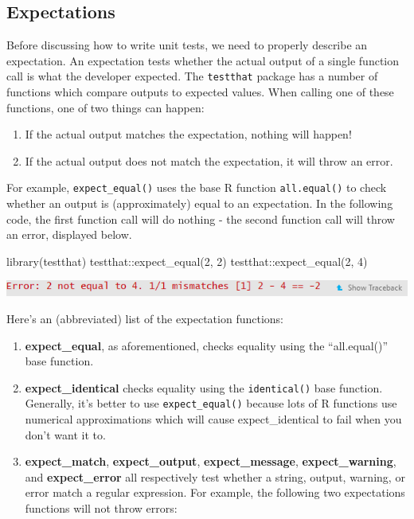 \documentclass[
]{book}
\newenvironment{Shaded}{\begin{snugshade}}{\end{snugshade}}
\newcommand{\DecValTok}[1]{\textcolor[rgb]{0.00,0.00,0.81}{#1}}
\newcommand{\FunctionTok}[1]{\textcolor[rgb]{0.00,0.00,0.00}{#1}}
\newcommand{\NormalTok}[1]{#1}
\newcommand{\SpecialCharTok}[1]{\textcolor[rgb]{0.00,0.00,0.00}{#1}}
\providecommand{\tightlist}{%
  \setlength{\itemsep}{0pt}\setlength{\parskip}{0pt}}
\begin{document}
\hypertarget{expectations}{%
\subsection{Expectations}\label{expectations}}

Before discussing how to write unit tests, we need to properly describe an expectation. An expectation tests whether the actual output of a single function call is what the developer expected. The \texttt{testthat} package has a number of functions which compare outputs to expected values. When calling one of these functions, one of two things can happen:

\begin{enumerate}
\def\labelenumi{\arabic{enumi}.}
\tightlist
\item
  If the actual output matches the expectation, nothing will happen!
\item
  If the actual output does not match the expectation, it will throw an error.
\end{enumerate}

For example, \texttt{expect\_equal()} uses the base R function \texttt{all.equal()} to check whether an output is (approximately) equal to an expectation. In the following code, the first function call will do nothing - the second function call will throw an error, displayed below.

\begin{Shaded}
\begin{Highlighting}[]
\FunctionTok{library}\NormalTok{(testthat)}
\NormalTok{testthat}\SpecialCharTok{::}\FunctionTok{expect\_equal}\NormalTok{(}\DecValTok{2}\NormalTok{, }\DecValTok{2}\NormalTok{)}
\NormalTok{testthat}\SpecialCharTok{::}\FunctionTok{expect\_equal}\NormalTok{(}\DecValTok{2}\NormalTok{, }\DecValTok{4}\NormalTok{)}
\end{Highlighting}
\end{Shaded}

\includegraphics{images/testSS/expectationerror.PNG}

Here's an (abbreviated) list of the expectation functions:

\begin{enumerate}
\def\labelenumi{\arabic{enumi}.}
\tightlist
\item
  \textbf{expect\_equal}, as aforementioned, checks equality using the ``all.equal()'' base function.
\item
  \textbf{expect\_identical} checks equality using the \texttt{identical()} base function. Generally, it's better to use \texttt{expect\_equal()} because lots of R functions use numerical approximations which will cause expect\_identical to fail when you don't want it to.
\item
  \textbf{expect\_match}, \textbf{expect\_output}, \textbf{expect\_message}, \textbf{expect\_warning}, and \textbf{expect\_error} all respectively test whether a string, output, warning, or error match a regular expression. For example, the following two expectations functions will not throw errors:
\end{enumerate}
\end{document}
